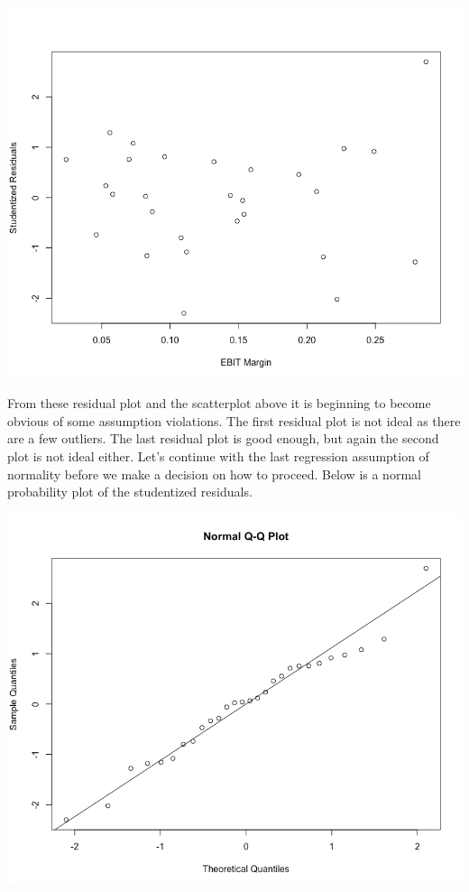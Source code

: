 \documentclass[12pt,letterpaper]{article}
\begin{document}
\begin{center}
\includegraphics[scale=0.3]{pic6.png}
\end{center}

From these residual plot and the scatterplot above it is beginning to become obvious of some assumption violations. The first residual plot is not ideal as there are a few outliers. The last residual plot is good enough, but again the second plot is not ideal either. Let's continue with the last regression assumption of normality before we make a decision on how to proceed. Below is a normal probability plot of the studentized residuals.

\begin{center}
\includegraphics[scale=0.5]{pic7.png}
\end{center}
\end{document}
